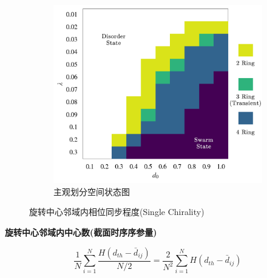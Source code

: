 \documentclass{article}
\begin{document}
\begin{figure}[H]
\begin{subfigure}[b]{0.49\textwidth}
		\includegraphics[width=\textwidth]{./figs/subjectiveOpRing.png}
		\vspace{-1cm}
		\caption{主观划分空间状态图}
	\end{subfigure}
	\vspace{-0.5cm}
	\caption{旋转中心邻域内相位同步程度(Single Chirality)}
	\label{fig:fig234c.5.2}
\end{figure}


\noindent\textbf{旋转中心邻域内中心数(截面时序序参量)}

$$
\frac{1}{N}\sum_{i=1}^N{\frac{H\left( d_{th}-\bar{d}_{ij} \right)}{N/2}}=\frac{2}{N^2}\sum_{i=1}^N{H\left( d_{th}-\bar{d}_{ij} \right)}
$$
\end{document}
